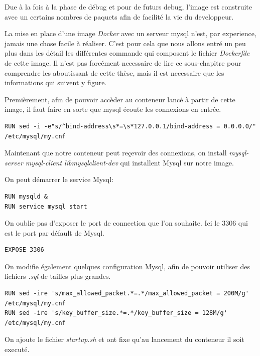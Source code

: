 Due à la fois à la phase de débug et pour de futurs debug, l'image est construite avec un certains nombres de paquets afin de facilité la vie du developpeur.

La mise en place d'une image \emph{Docker} avec un serveur mysql n'est, par experience, jamais une chose facile à réaliser. C'est pour cela que nous allons entré un peu plus dans les détail les différentes commande qui composent le fichier \emph{Dockerfile} de cette image. Il n'est pas forcément necessaire de lire ce sous-chapitre pour comprendre les aboutissant de cette thèse, mais il est necessaire que les informations qui suivent y figure.

Premièrement, afin de pouvoir accèder au conteneur lancé à partir de cette image, il faut faire en sorte que mysql écoute les connexions en entrée.

\lstset{language=bash}
\begin{lstlisting}[frame=single]
RUN sed -i -e"s/^bind-address\s*=\s*127.0.0.1/bind-address = 0.0.0.0/" /etc/mysql/my.cnf
\end{lstlisting}

Maintenant que notre conteneur peut reçevoir des connexions, on install \emph{mysql-server mysql-client libmysqlclient-dev} qui installent Mysql sur notre image.

On peut démarrer le service Mysql:

\begin{lstlisting}[frame=single]
RUN mysqld &
RUN service mysql start
\end{lstlisting}

On oublie pas d'exposer le port de connection que l'on souhaite. Ici le 3306 qui est le port par défault de Mysql.

\begin{lstlisting}[frame=single]
EXPOSE 3306
\end{lstlisting}

On modifie également quelques configuration Mysql, afin de pouvoir utiliser des fichiers \emph{.sql} de tailles plus grandes.

\begin{lstlisting}[frame=single]
RUN sed -ire 's/max_allowed_packet.*=.*/max_allowed_packet = 200M/g' /etc/mysql/my.cnf
RUN sed -ire 's/key_buffer_size.*=.*/key_buffer_size = 128M/g' /etc/mysql/my.cnf
\end{lstlisting}

On ajoute le fichier \emph{startup.sh} et ont fixe qu'au lancement du conteneur il soit executé.

